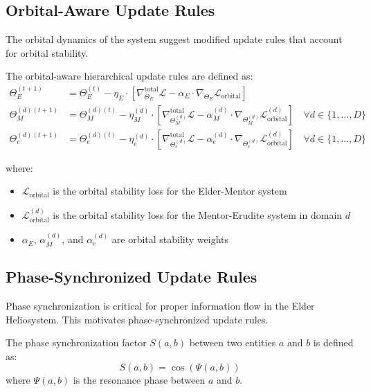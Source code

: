 \subsection{Orbital-Aware Update Rules}

The orbital dynamics of the system suggest modified update rules that account for orbital stability.

\begin{definition}
The orbital-aware hierarchical update rules are defined as:
\begin{align}
\Theta_E^{(t+1)} &= \Theta_E^{(t)} - \eta_E \cdot \left[ \nabla_{\Theta_E}^{\text{total}} \mathcal{L} - \alpha_E \cdot \nabla_{\Theta_E} \mathcal{L}_{\text{orbital}} \right] \\
\Theta_M^{(d)(t+1)} &= \Theta_M^{(d)(t)} - \eta_M^{(d)} \cdot \left[ \nabla_{\Theta_M^{(d)}}^{\text{total}} \mathcal{L} - \alpha_M^{(d)} \cdot \nabla_{\Theta_M^{(d)}} \mathcal{L}_{\text{orbital}}^{(d)} \right] \quad \forall d \in \{1, \ldots, D\} \\
\Theta_e^{(d)(t+1)} &= \Theta_e^{(d)(t)} - \eta_e^{(d)} \cdot \left[ \nabla_{\Theta_e^{(d)}}^{\text{total}} \mathcal{L} - \alpha_e^{(d)} \cdot \nabla_{\Theta_e^{(d)}} \mathcal{L}_{\text{orbital}}^{(d)} \right] \quad \forall d \in \{1, \ldots, D\}
\end{align}

where:
\begin{itemize}
    \item $\mathcal{L}_{\text{orbital}}$ is the orbital stability loss for the Elder-Mentor system
    \item $\mathcal{L}_{\text{orbital}}^{(d)}$ is the orbital stability loss for the Mentor-Erudite system in domain $d$
    \item $\alpha_E$, $\alpha_M^{(d)}$, and $\alpha_e^{(d)}$ are orbital stability weights
\end{itemize}
\end{definition}

\subsection{Phase-Synchronized Update Rules}

Phase synchronization is critical for proper information flow in the Elder Heliosystem. This motivates phase-synchronized update rules.

\begin{definition}
The phase synchronization factor $S(a, b)$ between two entities $a$ and $b$ is defined as:
\begin{equation}
S(a, b) = \cos(\Psi(a, b))
\end{equation}
where $\Psi(a, b)$ is the resonance phase between $a$ and $b$.
\end{definition}

